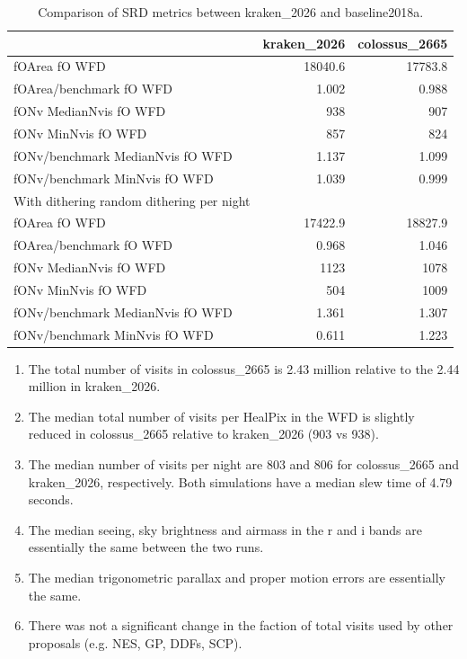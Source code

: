 \documentclass[DM,lsstdraft,authoryear,toc]{lsstdoc}
\begin{document}
\begin{table}[htp]
\caption{Comparison of SRD metrics between kraken\_2026 and baseline2018a.}
\begin{center}
\small
\begin{tabular}{lrr}
\toprule
{}                                                                                       &   kraken\_2026 & colossus\_2665   \\
\midrule
 fOArea fO WFD                                           &      18040.6	&17783.8  \\
 fOArea/benchmark fO WFD                        &         1.002	& 0.988   \\
 fONv MedianNvis fO WFD                          &          938	& 907     \\
 fONv MinNvis fO WFD                                &            857	& 824     \\
 fONv/benchmark MedianNvis fO WFD       &         1.137	& 1.099  \\
 fONv/benchmark MinNvis fO WFD             &         1.039	& 0.999    \\
 \midrule
 With dithering random dithering per night    &  & \\
 fOArea fO WFD                                           &      17422.9	& 18827.9  \\
 fOArea/benchmark fO WFD                        &         0.968	& 1.046   \\
 fONv MedianNvis fO WFD                          &          1123	& 1078    \\
 fONv MinNvis fO WFD                                &           504	& 1009     \\
 fONv/benchmark MedianNvis fO WFD       &          1.361	& 1.307 \\
 fONv/benchmark MinNvis fO WFD             &         0.611	& 1.223   \\

\bottomrule
\end{tabular}
\end{center}
\label{tab:srd-comparison-2665}
\end{table}

\begin{enumerate}
\item The total number of visits in colossus\_2665 is 2.43 million relative to the 2.44 million in kraken\_2026.
\item The median total number of visits per HealPix in the WFD is slightly reduced in colossus\_2665 relative to kraken\_2026 (903 vs 938).
\item The median number of visits per night are 803 and 806 for colossus\_2665 and kraken\_2026, respectively.
Both simulations have a median slew time of 4.79 seconds.
\item The median seeing, sky brightness and airmass in the r and i bands are essentially the same between the two runs.
\item The median trigonometric parallax and proper motion errors are essentially the same.
\item There was not a significant change in the faction of total visits used by other proposals (e.g. NES, GP, DDFs, SCP).
\end{enumerate}
\end{document}
